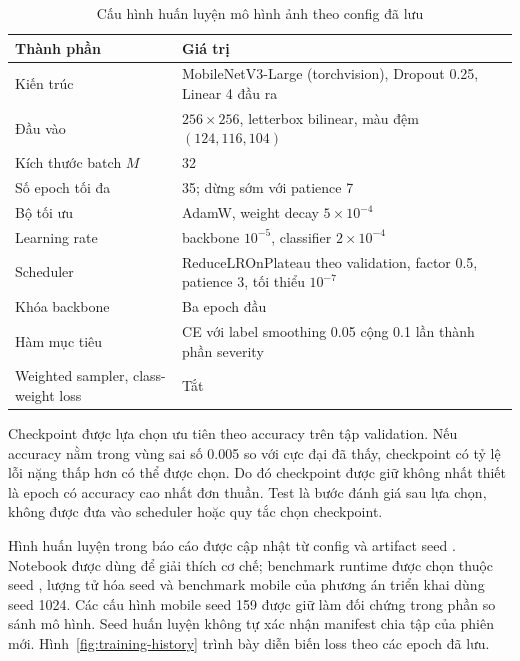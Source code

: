 \begin{table}[H]\centering\small
\caption{Cấu hình huấn luyện mô hình ảnh theo config đã lưu}\label{tab:train-config}
\begin{tabular}{P{.34\textwidth}P{.54\textwidth}}
\toprule Thành phần & Giá trị \\\midrule
Kiến trúc & MobileNetV3-Large (torchvision), Dropout 0.25, Linear 4 đầu ra \\
Đầu vào & $256\times256$, letterbox bilinear, màu đệm $(124,116,104)$ \\
Kích thước batch $M$ & 32 \\
Số epoch tối đa & 35; dừng sớm với patience 7 \\
Bộ tối ưu & AdamW, weight decay $5\times10^{-4}$ \\
Learning rate & backbone $10^{-5}$, classifier $2\times10^{-4}$ \\
Scheduler & ReduceLROnPlateau theo validation, factor 0.5, patience 3, tối thiểu $10^{-7}$ \\
Khóa backbone & Ba epoch đầu \\
Hàm mục tiêu & CE với label smoothing 0.05 cộng 0.1 lần thành phần severity \\
Weighted sampler, class-weight loss & Tắt \\
\bottomrule\end{tabular}
\end{table}

Checkpoint được lựa chọn ưu tiên theo accuracy trên tập validation. Nếu accuracy nằm trong vùng sai số 0.005 so với cực đại đã thấy, checkpoint có tỷ lệ lỗi nặng thấp hơn có thể được chọn. Do đó checkpoint được giữ không nhất thiết là epoch có accuracy cao nhất đơn thuần. Test là bước đánh giá sau lựa chọn, không được đưa vào scheduler hoặc quy tắc chọn checkpoint.

Hình huấn luyện trong báo cáo được cập nhật từ config và artifact seed \BenchmarkSeed{}. Notebook được dùng để giải thích cơ chế; benchmark runtime được chọn thuộc seed \BenchmarkSeed{}, lượng tử hóa seed \QuantizationSeed{} và benchmark mobile của phương án triển khai dùng seed 1024. Các cấu hình mobile seed 159 được giữ làm đối chứng trong phần so sánh mô hình. Seed huấn luyện không tự xác nhận manifest chia tập của phiên mới.
Hình~\ref{fig:training-history} trình bày diễn biến loss theo các epoch đã lưu.

